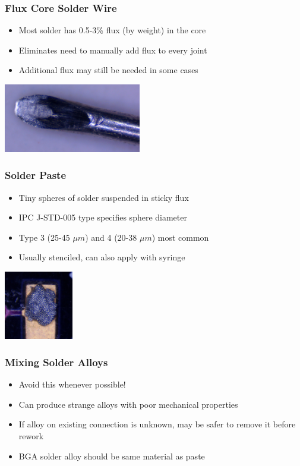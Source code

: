 \documentclass{beamer}
\begin{document}
\begin{frame}
\frametitle{Flux Core Solder Wire}
\begin{itemize}
\item Most solder has 0.5-3\% flux (by weight) in the core
\item Eliminates need to manually add flux to every joint
\item Additional flux may still be needed in some cases
\end{itemize}
\begin{center}
\includegraphics[width=6cm,keepaspectratio]{flux-core.jpg}
\end{center}
\end{frame}

\begin{frame}
\frametitle{Solder Paste}
\begin{itemize}
\item Tiny spheres of solder suspended in sticky flux
\item IPC J-STD-005 type specifies sphere diameter
\item Type 3 (25-45 $\mu m$) and 4 (20-38 $\mu m$) most common
\item Usually stenciled, can also apply with syringe
\end{itemize}
\begin{center}
\includegraphics[height=3cm,keepaspectratio]{solder-paste.jpg}
\end{center}
\end{frame}

\begin{frame}
\frametitle{Mixing Solder Alloys}
\begin{itemize}
\item Avoid this whenever possible!
\item Can produce strange alloys with poor mechanical properties
\item If alloy on existing connection is unknown, may be safer to remove it before rework
\item BGA solder alloy should be same material as paste
\end{itemize}
\end{frame}
\end{document}
